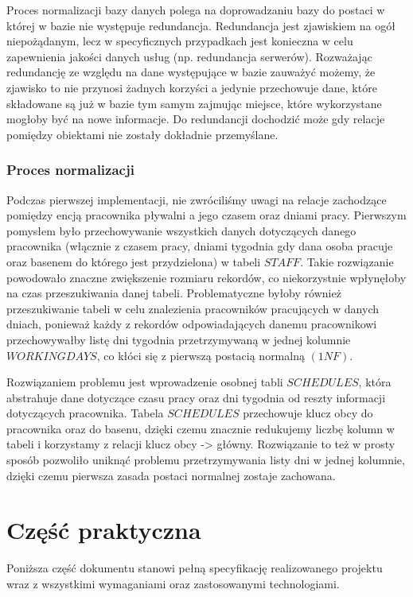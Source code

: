 \documentclass[a4paper]{article}
\begin{document}
Proces normalizacji bazy danych polega na doprowadzaniu bazy do postaci w której w bazie nie występuje redundancja. Redundancja jest zjawiskiem na ogół niepożądanym, lecz w specyficznych przypadkach jest konieczna w celu zapewnienia jakości danych usług (np. redundancja serwerów). Rozważając redundancję ze względu na dane występujące w bazie zauważyć możemy, że zjawisko to nie przynosi żadnych korzyści a jedynie przechowuje dane, które składowane są już w bazie tym samym zajmując miejsce, które wykorzystane mogłoby być na nowe informacje. Do redundancji dochodzić może gdy relacje pomiędzy obiektami nie zostały dokładnie przemyślane.

\subsubsection{Proces normalizacji}

Podczas pierwszej implementacji, nie zwróciliśmy uwagi na relacje zachodzące pomiędzy encją pracownika pływalni a jego czasem oraz dniami pracy. Pierwszym pomysłem było przechowywanie wszystkich danych dotyczących danego pracownika (włącznie z czasem pracy, dniami tygodnia gdy dana osoba pracuje oraz basenem do którego jest przydzielona) w tabeli $STAFF$. Takie rozwiązanie powodowało znaczne zwiększenie rozmiaru rekordów, co niekorzystnie wpłynęłoby na czas przeszukiwania danej tabeli. Problematyczne byłoby również przeszukiwanie tabeli w celu znalezienia pracowników pracujących w danych dniach, ponieważ każdy z rekordów odpowiadających danemu pracownikowi przechowywałby listę dni tygodnia przetrzymywaną w jednej kolumnie $WORKINGDAYS$, co kłóci się z pierwszą postacią normalną $(1NF)$.

Rozwiązaniem problemu jest wprowadzenie osobnej tabli $SCHEDULES$, która abstrahuje dane dotyczące czasu pracy oraz dni tygodnia od reszty informacji dotyczących pracownika. Tabela $SCHEDULES$ przechowuje klucz obcy do pracownika oraz do basenu, dzięki czemu znacznie redukujemy liczbę kolumn w tabeli i korzystamy z relacji klucz obcy -> główny. Rozwiązanie to też w prosty sposób pozwoliło uniknąć problemu przetrzymywania listy dni w jednej kolumnie, dzięki czemu pierwsza zasada postaci normalnej zostaje zachowana.

\section{Część praktyczna}

Poniższa część dokumentu stanowi pełną specyfikację realizowanego projektu wraz z wszystkimi wymaganiami oraz zastosowanymi technologiami.
\end{document}
